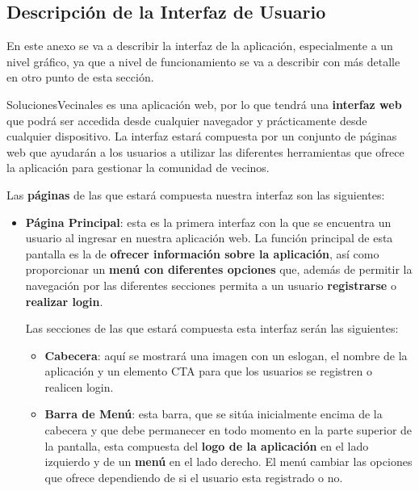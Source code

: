 \newpage

\appendix

\begin{appendices}
	
\section{Descripción de la Interfaz de Usuario}
\label{sec:apenA}

En este anexo se va a describir la interfaz de la aplicación, especialmente a un nivel gráfico, ya que a nivel de funcionamiento se va a describir con más detalle en otro punto de esta sección.

SolucionesVecinales es una aplicación web, por lo que tendrá una \textbf{interfaz web} que podrá ser accedida desde cualquier navegador y prácticamente desde cualquier dispositivo. La interfaz estará compuesta por un conjunto de páginas web que ayudarán a los usuarios a utilizar las diferentes herramientas que ofrece la aplicación para gestionar la comunidad de vecinos. 

Las \textbf{páginas} de las que estará compuesta nuestra interfaz son las siguientes:

\begin{itemize}
	\item \textbf{Página Principal}: esta es la primera interfaz con la que se encuentra un usuario al ingresar en nuestra aplicación web. La función principal de esta pantalla es la de \textbf{ofrecer información sobre la aplicación}, así como proporcionar un\textbf{ menú con diferentes opciones} que, además de permitir la navegación por las diferentes secciones permita a un usuario \textbf{registrarse} o \textbf{realizar \gls{login}}.
	
	Las secciones de las que estará compuesta esta interfaz serán las siguientes:
	
	\begin{itemize}
		\item \textbf{Cabecera}: aquí se mostrará una imagen con un eslogan, el nombre de la aplicación y un elemento \gls{CTA} para que los usuarios se registren o realicen login.
		
		\item \textbf{Barra de Menú}: esta barra, que se sitúa inicialmente encima de la cabecera y que debe permanecer en todo momento en la parte superior de la pantalla, esta compuesta del \textbf{logo de la aplicación} en el lado izquierdo y de un \textbf{menú} en el lado derecho. El menú cambiar las opciones que ofrece dependiendo de si el usuario esta registrado o no. 
		

\end{itemize}
\end{itemize}
\end{appendices}
